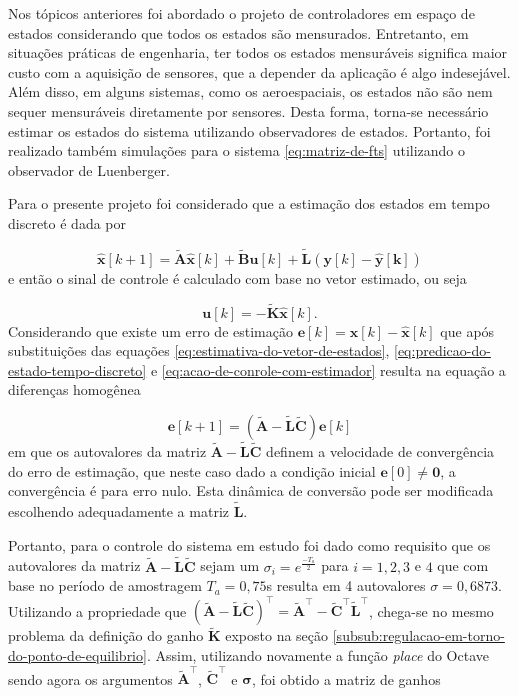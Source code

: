 Nos tópicos anteriores foi abordado o projeto de controladores em espaço de
estados considerando que todos os estados são mensurados. Entretanto, em
situações práticas de engenharia, ter todos os estados mensuráveis significa
maior custo com a aquisição de sensores, que a depender da aplicação é algo
indesejável. Além disso, em alguns sistemas, como os aeroespaciais, os estados
não são nem sequer mensuráveis diretamente por sensores. Desta forma, torna-se
necessário estimar os estados do sistema utilizando observadores de estados.
Portanto, foi realizado também simulações para o sistema \ref{eq:matriz-de-fts}
utilizando o observador de Luenberger.

Para o presente projeto foi considerado que a estimação dos estados em tempo
discreto é dada por

\begin{equation}
    \label{eq:predicao-do-estado-tempo-discreto}
    \mathbf{\hat{x}}[k+1] = \mathbf{\tilde{A}}\mathbf{\hat{x}}[k]
                            + \mathbf{\tilde{B}}\mathbf{u}[k]
                            + \mathbf{\tilde{L}}(\mathbf{y}[k] - \mathbf{\hat{y}[k]})
\end{equation} e então o sinal de controle é calculado com base no
vetor estimado, ou seja

\begin{equation}
    \label{eq:acao-de-conrole-com-estimador}
    \mathbf{u}[k] = -\mathbf{\tilde{K}}\mathbf{\hat{x}}[k]\text{.}
\end{equation} Considerando que existe um erro de estimação
$\mathbf{e}[k] = \mathbf{x}[k] - \mathbf{\hat{x}}[k]$ que após substituições das
equações \ref{eq:estimativa-do-vetor-de-estados},
\ref{eq:predicao-do-estado-tempo-discreto} e
\ref{eq:acao-de-conrole-com-estimador} resulta na equação a diferenças homogênea

\begin{equation}
    \label{eq:erro-de-estimacao}
    \mathbf{e}[k+1] = (\mathbf{\tilde{A}}-\mathbf{\tilde{L}}\mathbf{\tilde{C}})\mathbf{e}[k]
\end{equation} em que os autovalores da matriz
$\mathbf{\tilde{A}}-\mathbf{\tilde{L}}\mathbf{\tilde{C}}$ definem a velocidade
de convergência do erro de estimação, que neste caso dado a condição inicial
$\mathbf{e}[0] \neq \mathbf{0}$, a convergência é para erro nulo. Esta dinâmica
de conversão pode ser modificada escolhendo adequadamente a matriz
$\mathbf{\tilde{L}}$.

Portanto, para o controle do sistema em estudo foi dado como requisito que os
autovalores da matriz $\mathbf{\tilde{A}}-\mathbf{\tilde{L}}\mathbf{\tilde{C}}$
sejam um $\sigma_i = e^{\frac{-T_a}{2}}$ para $i = 1, 2, 3$ e $4$ que com base no
período de amostragem $T_a = 0,75$s resulta em 4 autovalores $\sigma = 0,6873$.
Utilizando a propriedade que
$(\mathbf{\tilde{A}}-\mathbf{\tilde{L}}\mathbf{\tilde{C}})^\top =
\mathbf{\tilde{A}}^\top - \mathbf{\tilde{C}}^\top\mathbf{\tilde{L}}^\top$,
chega-se no mesmo problema da definição do ganho $\mathbf{\tilde{K}}$ exposto na
seção \ref{subsub:regulacao-em-torno-do-ponto-de-equilibrio}. Assim, utilizando
novamente a função \textit{place} do Octave sendo agora os argumentos
$\mathbf{\tilde{A}}^\top$, $\mathbf{\tilde{C}}^\top$ e $\mathbf{\sigma}$, foi
obtido a matriz de ganhos

